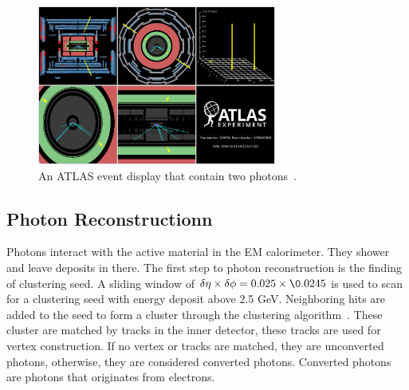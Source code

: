 \begin{figure}[!htb]
    \begin{center}
        \includegraphics[width=0.7\textwidth]{figures/common_ana/photonEvent}
        \caption{        
        An ATLAS event display that contain two photons~\cite{atlas}.
        }
        \label{fig:photonEvent}
    \end{center}
\end{figure}

\subsection{Photon Reconstructionn}
Photons interact with the active material in the EM calorimeter. They shower and leave deposits in there. The first step to photon reconstruction is the finding of clustering seed. A sliding window of $\delta \eta \times \delta \phi = 0.025 \times \0.0245$ is used to scan for a clustering seed with energy deposit above 2.5 GeV. Neighboring hits are added to the seed to form a cluster through the clustering algorithm~\cite{Lampl:1099735}. 
These cluster are matched by tracks in the inner detector, these tracks are used for vertex construction. If no vertex or tracks are matched, they are unconverted photons, otherwise, they are considered converted photons. Converted photons are photons that originates from electrons. 


